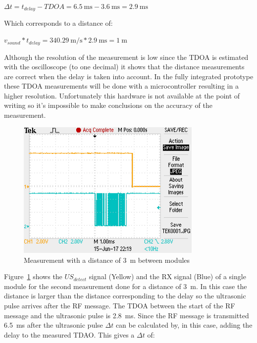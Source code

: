 $ \Delta t = t_{delay} - TDOA = \SI{6.5}{\milli\second} - \SI{3.6}{\milli\second} = \SI{2.9}{\milli\second} $

Which corresponds to a distance of:

$ v_{sound} * t_{delay} = \SI{340.29}{\meter\per\second} * \SI{2.9}{\milli\second} = \SI{1}{\meter} $

Although the resolution of the measurement is low since the TDOA is estimated with the oscilloscope (to one decimal) it shows that the distance measurements are correct when the delay is taken into account.
In the fully integrated prototype these TDOA measurements will be done with a microcontroller resulting in a higher resolution.
Unfortunately this hardware is not available at the point of writing so it's impossible to make conclusions on the accuracy of the measurement.

\begin{figure}[H]
\centering
\includegraphics[width=0.8\textwidth]{Figures/test_3m.JPG}
\caption{Measurement with a distance of \SI{3}{\meter} between modules}
\label{fig:mes_3}
\end{figure}


Figure~\ref{fig:mes_3} shows the $US_{detect}$ signal (Yellow) and the RX signal (Blue) of a single module for the second measurement done for a distance of \SI{3}{\meter}.
In this case the distance is larger than the distance corresponding to the delay so the ultrasonic pulse arrives after the RF message.
The TDOA between the start of the RF message and the ultrasonic pulse is \SI{2.8}{\milli\second}.
Since the RF message is transmitted \SI{6.5}{\milli\second} after the ultrasonic pulse $\Delta t$ can be calculated by, in this case, adding the delay to the measured TDAO.
This gives a $\Delta t$ of:

